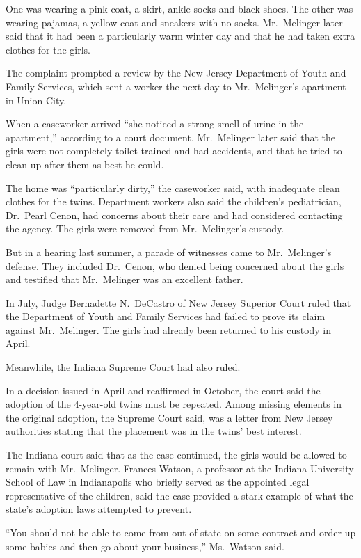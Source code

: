 ﻿\documentclass[12pt]{article}
\begin{document}
One was wearing a pink coat, a skirt, ankle socks and black shoes. The other was wearing pajamas, a
yellow coat and sneakers with no socks. Mr.~Melinger later said that it had been a particularly warm
winter day and that he had taken extra clothes for the girls.

The complaint prompted a review by the New Jersey Department of Youth and Family Services, which
sent a worker the next day to Mr.~Melinger's apartment in Union City.

When a caseworker arrived ``she noticed a strong smell of urine in the apartment,'' according to a
court document. Mr.~Melinger later said that the girls were not completely toilet trained and had
accidents, and that he tried to clean up after them as best he could.

The home was ``particularly dirty,'' the caseworker said, with inadequate clean clothes for the
twins. Department workers also said the children's pediatrician, Dr.~Pearl Cenon, had concerns about
their care and had considered contacting the agency. The girls were removed from Mr.~Melinger's
custody.

But in a hearing last summer, a parade of witnesses came to Mr.~Melinger's defense. They included
Dr.~Cenon, who denied being concerned about the girls and testified that Mr.~Melinger was an
excellent father.

In July, Judge Bernadette N.~DeCastro of New Jersey Superior Court ruled that the Department of
Youth and Family Services had failed to prove its claim against Mr.~Melinger. The girls had already
been returned to his custody in April.

Meanwhile, the Indiana Supreme Court had also ruled.

In a decision issued in April and reaffirmed in October, the court said the adoption of the
4-year-old twins must be repeated. Among missing elements in the original adoption, the Supreme
Court said, was a letter from New Jersey authorities stating that the placement was in the twins'
best interest.

The Indiana court said that as the case continued, the girls would be allowed to remain with
Mr.~Melinger. Frances Watson, a professor at the Indiana University School of Law in Indianapolis
who briefly served as the appointed legal representative of the children, said the case provided a
stark example of what the state's adoption laws attempted to prevent.

``You should not be able to come from out of state on some contract and order up some babies and
then go about your business,'' Ms.~Watson said.
\end{document}

